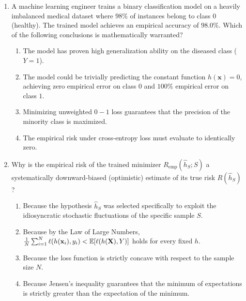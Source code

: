 \begin{enumerate}[label=\textbf{MCQ\arabic*.}]
    \item A machine learning engineer trains a binary classification model on a heavily imbalanced medical dataset where $98\%$ of instances belong to class $0$ (healthy). The trained model achieves an empirical accuracy of $98.0\%$. Which of the following conclusions is mathematically warranted?
    \begin{enumerate}[label=(\alph*)]
        \item The model has proven high generalization ability on the diseased class ($Y = 1$).
        \item The model could be trivially predicting the constant function $h(\mathbf{x}) = 0$, achieving zero empirical error on class $0$ and $100\%$ empirical error on class $1$.
        \item Minimizing unweighted $0-1$ loss guarantees that the precision of the minority class is maximized.
        \item The empirical risk under cross-entropy loss must evaluate to identically zero.
    \end{enumerate}

    \item Why is the empirical risk of the trained minimizer $R_{\text{emp}}(\hat{h}_S; S)$ a systematically downward-biased (optimistic) estimate of its true risk $R(\hat{h}_S)$?
    \begin{enumerate}[label=(\alph*)]
        \item Because the hypothesis $\hat{h}_S$ was selected specifically to exploit the idiosyncratic stochastic fluctuations of the specific sample $S$.
        \item Because by the Law of Large Numbers, $\frac{1}{N}\sum_{i=1}^N \ell(h(\mathbf{x}_i), y_i) < \operatorname{\mathbb{E}}[\ell(h(\mathbf{X}), Y)]$ holds for every fixed $h$.
        \item Because the loss function is strictly concave with respect to the sample size $N$.
        \item Because Jensen's inequality guarantees that the minimum of expectations is strictly greater than the expectation of the minimum.
    \end{enumerate}
\end{enumerate}
